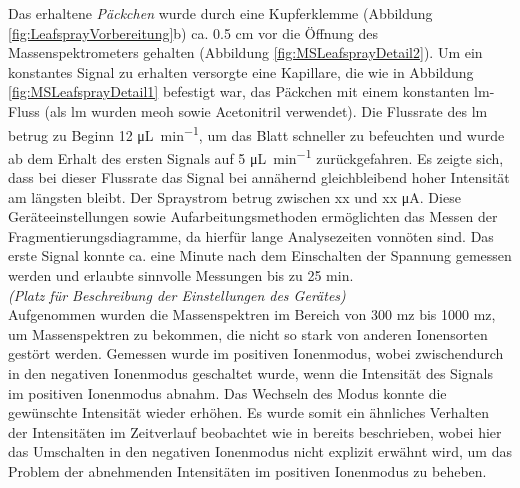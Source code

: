 Das erhaltene \textit{Päckchen} wurde durch eine Kupferklemme (Abbildung \ref{fig:LeafsprayVorbereitung}b) ca. 0.5 cm  vor die Öffnung des Massenspektrometers gehalten (Abbildung \ref{fig:MSLeafsprayDetail2}). Um ein konstantes Signal zu erhalten versorgte eine Kapillare, die wie in Abbildung \ref{fig:MSLeafsprayDetail1} befestigt war, das Päckchen mit einem konstanten \gls{lm}-Fluss (als \gls{lm} wurden \gls{meoh} sowie Acetonitril verwendet). Die Flussrate des \gls{lm} betrug zu Beginn 12 \si{\uL\per\minute}, um das Blatt schneller zu befeuchten und wurde ab dem Erhalt des ersten Signals auf 5 \si{\uL\per\minute} zurückgefahren. Es zeigte sich, dass bei dieser Flussrate das Signal bei annähernd gleichbleibend hoher Intensität am längsten bleibt. Der Spraystrom betrug zwischen xx und xx \si{\micro\ampere}. Diese Geräteeinstellungen sowie Aufarbeitungsmethoden ermöglichten das Messen der Fragmentierungsdiagramme, da hierfür lange Analysezeiten vonnöten sind. Das erste Signal konnte ca. eine Minute nach dem Einschalten der Spannung gemessen werden und erlaubte sinnvolle Messungen bis zu 25 min. \\

\textit{(Platz für Beschreibung der Einstellungen des Gerätes)}\\

Aufgenommen wurden die Massenspektren im Bereich von 300 \gls{mz} bis 1000 \gls{mz}, um  Massenspektren zu bekommen, die nicht so stark von anderen Ionensorten gestört werden. Gemessen wurde im positiven Ionenmodus, wobei zwischendurch in den negativen Ionenmodus geschaltet wurde, wenn die Intensität des Signals im positiven Ionenmodus abnahm. Das Wechseln des Modus konnte die gewünschte Intensität wieder erhöhen. Es wurde somit ein ähnliches Verhalten der Intensitäten im Zeitverlauf beobachtet wie in \cite{RapidScreeningLeafSpray} bereits beschrieben, wobei hier das Umschalten in den negativen Ionenmodus nicht explizit erwähnt wird, um das Problem der abnehmenden Intensitäten im positiven Ionenmodus zu beheben.


